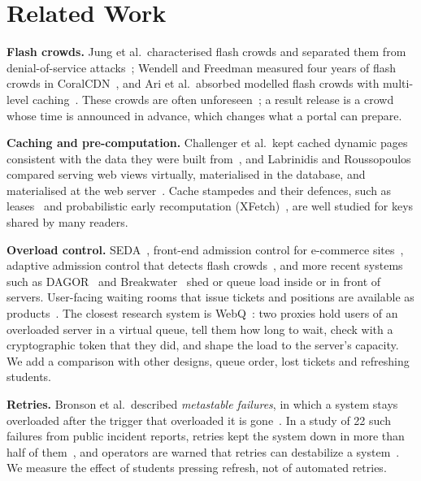\section{Related Work}

\textbf{Flash crowds.} Jung et al.\ characterised flash crowds and separated
them from denial-of-service attacks~\cite{jung2002flash}; Wendell and Freedman
measured four years of flash crowds in CoralCDN~\cite{wendell2011going}, and
Ari et al.\ absorbed modelled flash crowds with multi-level
caching~\cite{ari2003flash}. These
crowds are often unforeseen~\cite{wendell2011going}; a result release is a
crowd whose time is announced in advance, which changes what a portal can
prepare.

\textbf{Caching and pre-computation.} Challenger et al.\ kept cached dynamic
pages consistent with the data they were built from~\cite{challenger1999scalable}, and Labrinidis
and Roussopoulos compared serving web views virtually, materialised in the
database, and materialised at the web server~\cite{labrinidis2000webview}.
Cache stampedes and their defences, such as leases~\cite{nishtala2013memcache}
and probabilistic early recomputation (XFetch)~\cite{vattani2015xfetch}, are
well studied for keys shared by many readers.

\textbf{Overload control.} SEDA~\cite{welsh2001seda}, front-end admission
control for e-commerce sites~\cite{elnikety2004gatekeeper}, adaptive admission
control that detects flash crowds~\cite{chen2005news}, and more recent
systems such as DAGOR~\cite{zhou2018dagor} and Breakwater~\cite{cho2020breakwater}
shed or queue load inside or in front of servers. User-facing waiting rooms
that issue tickets and positions are available as products~\cite{cloudflare2026wr,aws2022vwr}.
The closest research system is WebQ~\cite{doshi2015webq}: two proxies hold
users of an overloaded server in a virtual queue, tell them how long to wait,
check with a cryptographic token that they did, and shape the load to the
server's capacity. We add a comparison with other designs, queue order, lost
tickets and refreshing students.

\textbf{Retries.} Bronson et al.\ described \emph{metastable failures}, in which
a system stays overloaded after the trigger that overloaded it is
gone~\cite{bronson2021metastable}. In a study of 22 such failures from public
incident reports, retries kept the system down in more than half of
them~\cite{huang2022metastable}, and operators are warned that retries can
destabilize a system~\cite{beyer2016sre}. We measure the effect of students
pressing refresh, not of automated retries.

